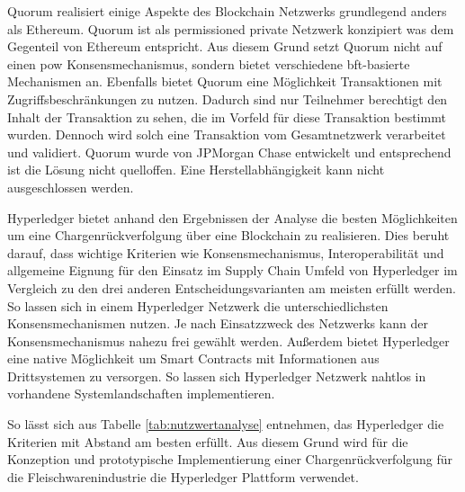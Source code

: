 Quorum realisiert einige Aspekte des Blockchain Netzwerks grundlegend anders als Ethereum. Quorum ist als permissioned private Netzwerk konzipiert was dem Gegenteil von Ethereum entspricht. Aus diesem Grund setzt Quorum nicht auf einen \ac{pow} Konsensmechanismus, sondern bietet verschiedene \ac{bft}-basierte Mechanismen an. Ebenfalls bietet Quorum eine Möglichkeit Transaktionen mit Zugriffsbeschränkungen zu nutzen. Dadurch sind nur Teilnehmer berechtigt den Inhalt der Transaktion zu sehen, die im Vorfeld für diese Transaktion bestimmt wurden. Dennoch wird solch eine Transaktion vom Gesamtnetzwerk verarbeitet und validiert. Quorum wurde von JPMorgan Chase entwickelt und entsprechend ist die Lösung nicht quelloffen. Eine Herstellabhängigkeit kann nicht ausgeschlossen werden.

Hyperledger bietet anhand den Ergebnissen der Analyse die besten Möglichkeiten um eine Chargenrückverfolgung über eine Blockchain zu realisieren. Dies beruht darauf, dass wichtige Kriterien wie Konsensmechanismus, Interoperabilität und allgemeine Eignung für den Einsatz im Supply Chain Umfeld von Hyperledger im Vergleich zu den drei anderen Entscheidungsvarianten am meisten erfüllt werden. So lassen sich in einem Hyperledger Netzwerk die unterschiedlichsten Konsensmechanismen nutzen. Je nach Einsatzzweck des Netzwerks kann der Konsensmechanismus nahezu frei gewählt werden. Außerdem bietet Hyperledger eine native Möglichkeit um Smart Contracts mit Informationen aus Drittsystemen zu versorgen. So lassen sich Hyperledger Netzwerk nahtlos in vorhandene Systemlandschaften implementieren.

So lässt sich aus Tabelle \ref{tab:nutzwertanalyse} entnehmen, das Hyperledger die Kriterien mit Abstand am besten erfüllt. Aus diesem Grund wird für die Konzeption und prototypische Implementierung einer Chargenrückverfolgung für die Fleischwarenindustrie die Hyperledger Plattform verwendet.

